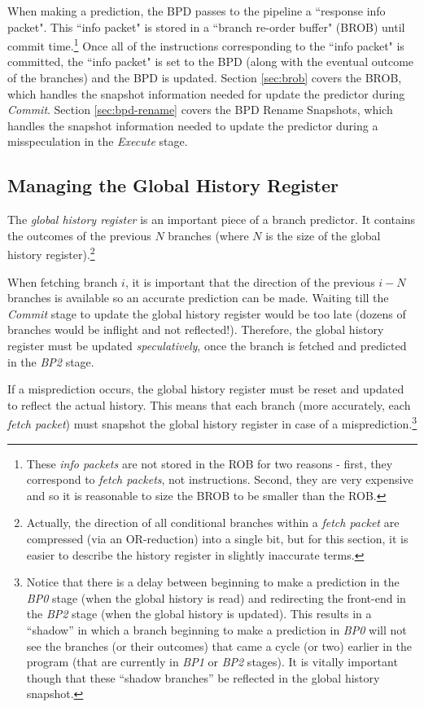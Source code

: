 When making a prediction, the BPD passes to the pipeline a ``response info packet".  This ``info packet" is stored in a ``branch re-order buffer" (BROB) until commit time.\footnote{These {\em info packets} are not stored in the ROB for two reasons - first, they correspond to {\em fetch packets}, not instructions.  Second, they are very expensive and so it is reasonable to size the BROB to be smaller than the ROB.}  Once all of the instructions corresponding to the ``info packet" is committed, the ``info packet" is set to the BPD (along with the eventual outcome of the branches) and the BPD is updated. Section \ref{sec:brob} covers the BROB, which handles the snapshot information needed for update the predictor during {\em Commit}. Section \ref{sec:bpd-rename} covers the BPD Rename Snapshots, which handles the snapshot information needed to update the predictor during a misspeculation in the {\em Execute} stage.

\subsection{Managing the Global History Register}\label{sec:ghistory}

The {\em global history register} is an important piece of a branch predictor. It contains the outcomes of the previous $N$ branches (where $N$ is the size of the global history register).\footnote{Actually, the direction of all conditional branches within a {\em fetch packet} are compressed (via an OR-reduction) into a single bit, but for this section, it is easier to describe the history register in slightly inaccurate terms.}

When fetching branch $i$, it is important that the direction of the previous $i-N$ branches is available so an accurate prediction can be made.  Waiting till the {\em Commit} stage to update the global history register would be too late (dozens of branches would be inflight and not reflected!). Therefore, the global history register must be updated {\em speculatively}, once the branch is fetched and predicted in the {\em BP2} stage.

If a misprediction occurs, the global history register must be reset and updated to reflect the actual history.  This means that each branch (more accurately, each {\em fetch packet}) must snapshot the global history register in case of a misprediction.\footnote{Notice that there is a delay between beginning to make a prediction in the {\em BP0} stage (when the global history is read) and redirecting the front-end in the {\em BP2} stage (when the global history is updated).  This results in a ``shadow'' in which a branch beginning to make a prediction in {\em BP0} will not see the branches (or their outcomes) that came a cycle (or two) earlier in the program (that are currently in {\em BP1} or {\em BP2} stages).  It is vitally important though that these ``shadow branches'' be reflected in the global history snapshot.}

